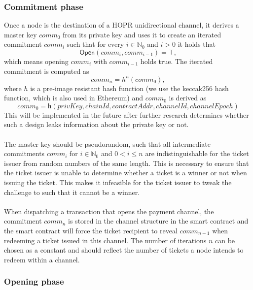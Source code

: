 \subsubsection{Commitment phase}

Once a node is the destination of a HOPR unidirectional channel, it derives a
master key $comm_0$ from its private key and uses it to create an iterated
commitment $comm_i$ such that for every $i \in \mathbb{N}_0$ and $i > 0$ it
holds that $$ \mathsf{Open}(comm_{i}, comm_{i-1}) = \top,$$ which means opening
$comm_{i}$ with $comm_{i-1}$ holds true.
The iterated commitment is computed as $$comm_n = h^n(comm_0),$$ where $h$ is a
pre-image resistant hash function (we use the keccak256 hash function, which is also used
in Ethereum) and $comm_0$ is derived as $$ comm_0 = \mathsf{h}(privKey,chainId,
contractAddr, channelId, channelEpoch)$$
This will be implemented in the future after further research
determines whether such a design leaks information about the
private key or not. \\~\\The master key should be pseudorandom, such that
all intermediate commitments $comm_{i}$ for $i \in \mathbb{N}_0$ and $0 < i \le
n$ are indistinguishable for the ticket issuer from random numbers of the same
length. This is necessary to ensure that the ticket issuer is unable to
determine whether a ticket is a winner or not when issuing the ticket. This makes
it infeasible for the ticket issuer to tweak the challenge to such that it
cannot be a winner.
\\~\\When dispatching a transaction that opens the payment channel, the
commitment $comm_n$ is stored in the channel structure in the smart contract and
the smart contract will force the ticket recipient to reveal $comm_{n-1}$ when
redeeming a ticket issued in this channel. The number of iterations $n$ can be
chosen as a constant and should reflect the number of tickets a node intends to
redeem within a channel.

\subsubsection{Opening phase}

